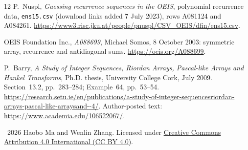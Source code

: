 \documentclass[11pt]{article}
\begin{document}
\begin{thebibliography}{12}
P.~Nuspl, \emph{Guessing recurrence sequences in the OEIS}, polynomial
recurrence data, \texttt{ens15.csv} (download links added 7 July 2023),
rows A081124 and A084261.
\url{https://www3.risc.jku.at/people/pnuspl/CSV_OEIS/dfin/ens15.csv}.

OEIS Foundation Inc., \emph{A088699}, Michael Somos, 8 October 2003:
symmetric array, recurrence and antidiagonal sums.
\url{https://oeis.org/A088699}.

P.~Barry, \emph{A Study of Integer Sequences, Riordan Arrays,
Pascal-like Arrays and Hankel Transforms}, Ph.D. thesis,
University College Cork, July 2009.
Section~13.2, pp.~283--284; Example~64, pp.~53--54.
\url{https://research.setu.ie/en/publications/a-study-of-integer-sequencesriordan-arrays-pascal-like-arraysand--4/}.
Author-posted text:
\url{https://www.academia.edu/106522067/}.
\end{thebibliography}

\bigskip
\noindent\small\textcopyright\ 2026 Haobo Ma and Wenlin Zhang.
Licensed under \href{https://creativecommons.org/licenses/by/4.0/}{Creative
Commons Attribution 4.0 International (CC BY 4.0)}.
\end{document}
